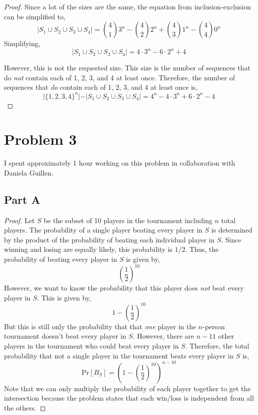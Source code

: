 \documentclass{article}
\begin{document}
\begin{proof}
  Since a lot of the sizes are the same, the equation from inclusion-exclusion
  can be simplified to,
  $$ \vert S_1 \cup S_2 \cup S_3 \cup S_4 \vert = \binom{4}{1} 3^n -
  \binom{4}{2} 2^n + \binom{4}{3} 1^n - \binom{4}{4} 0^n $$
  Simplifying,
  $$ \vert S_1 \cup S_2 \cup S_3 \cup S_4 \vert = 4 \cdot 3^n - 6 \cdot 2^n + 4
  $$

  However, this is not the requested size. This size is the number of sequences
  that do \textit{not} contain each of 1, 2, 3, and 4 at least once. Therefore,
  the number of sequences that \textit{do} contain each of 1, 2, 3, and 4 at
  least once is,
  $$ \vert \{1, 2, 3, 4\}^n \vert - \vert  S_1 \cup S_2 \cup S_3 \cup S_4 \vert
  = 4^n - 4 \cdot 3^n + 6 \cdot 2^n - 4 $$

\end{proof}

\break

\section*{Problem 3}

I spent approximately 1 hour working on this problem in collaboration with
Daniela Guillen.

\subsection*{Part A}

\begin{proof}

  Let $S$ be the subset of 10 players in the tournament including $n$ total
  players. The probability of a single player beating every player in $S$ is
  determined by the product of the probability of beating each individual
  player in $S$. Since winning and losing are equally likely, this probability
  is $1/2$. Thus, the probability of beating every player in $S$ is given by,
  $$ \left( \frac{1}{2} \right)^{10} $$
  However, we want to know the probability that this player does \textit{not}
  beat every player in $S$. This is given by,
  $$ 1 - \left( \frac{1}{2} \right)^{10} $$
  But this is still only the probability that that \textit{one} player in the
  $n$-person tournament doesn't beat every player in $S$. However, there are $n
  - 11$ other players in the tournament who could beat every player in $S$.
  Therefore, the total probability that not a single player in the tournament
  beats every player in $S$ is,
  $$ \mathrm{Pr}[B_S] = \left(1 - \left( \frac{1}{2} \right)^{10} \right)^{n -
  10} $$
  Note that we can only multiply the probability of each player together to get
  the intersection because the problem states that each win/loss is independent
  from all the others.

\end{proof}
\end{document}
